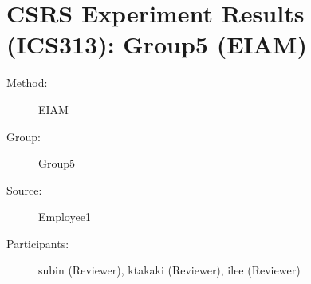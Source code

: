 
%          
	  
\chapter {CSRS Experiment Results (ICS313): Group5 (EIAM)}
\small

\begin{description}
\item [Method:] EIAM
\item [Group:] Group5
\item [Source:] Employee1
\item [Participants:] subin (Reviewer), ktakaki (Reviewer), ilee (Reviewer)
\end{description}
